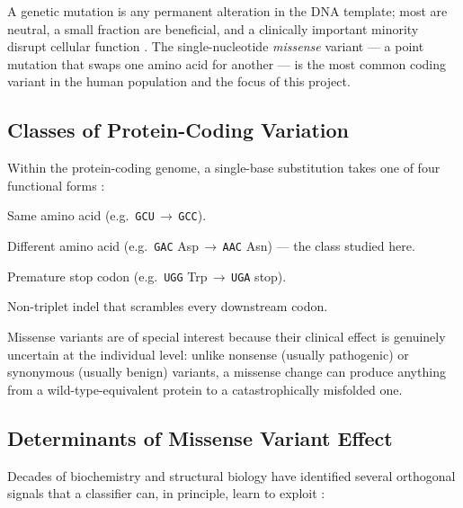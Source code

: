 \documentclass[11pt,a4paper,oneside]{report}
\begin{document}
A genetic mutation is any permanent alteration in the DNA
template; most are neutral, a small fraction are beneficial, and
a clinically important minority disrupt cellular function
\citep{macarthur2014guidelines}. The single-nucleotide
\emph{missense} variant --- a point mutation that swaps one amino
acid for another --- is the most common coding variant in the
human population and the focus of this project.

\subsection{Classes of Protein-Coding Variation}
\label{sec:intro-variantclasses}

Within the protein-coding genome, a single-base substitution
takes one of four functional forms \citep{alberts2015molecular}:

\begin{description}[style=nextline, leftmargin=2.2em, itemsep=0.25em]
  \item[Synonymous.] Same amino acid (e.g.\ \texttt{GCU}\,$\rightarrow$\,\texttt{GCC}).
  \item[Missense.] Different amino acid (e.g.\ \texttt{GAC} Asp\,$\rightarrow$\,\texttt{AAC} Asn) --- the class studied here.
  \item[Nonsense.] Premature stop codon (e.g.\ \texttt{UGG} Trp\,$\rightarrow$\,\texttt{UGA} stop).
  \item[Frameshift.] Non-triplet indel that scrambles every downstream codon.
\end{description}

Missense variants are of special interest because their clinical
effect is genuinely uncertain at the individual level: unlike
nonsense (usually pathogenic) or synonymous (usually benign)
variants, a missense change can produce anything from a
wild-type-equivalent protein to a catastrophically misfolded one.

\subsection{Determinants of Missense Variant Effect}
\label{sec:intro-determinants}

Decades of biochemistry and structural biology have identified
several orthogonal signals that a classifier can, in principle,
learn to exploit \citep{stein2019inferring, guerois2002predicting}:
\end{document}
